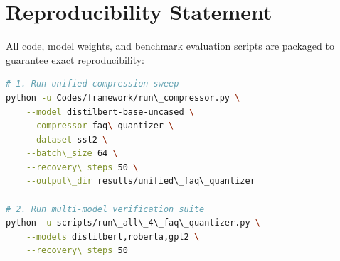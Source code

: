 \section{Reproducibility Statement}
All code, model weights, and benchmark evaluation scripts are packaged to guarantee exact reproducibility:
\begin{lstlisting}[language=bash]
# 1. Run unified compression sweep
python -u Codes/framework/run\_compressor.py \
    --model distilbert-base-uncased \
    --compressor faq\_quantizer \
    --dataset sst2 \
    --batch\_size 64 \
    --recovery\_steps 50 \
    --output\_dir results/unified\_faq\_quantizer

# 2. Run multi-model verification suite
python -u scripts/run\_all\_4\_faq\_quantizer.py \
    --models distilbert,roberta,gpt2 \
    --recovery\_steps 50
\end{lstlisting}
